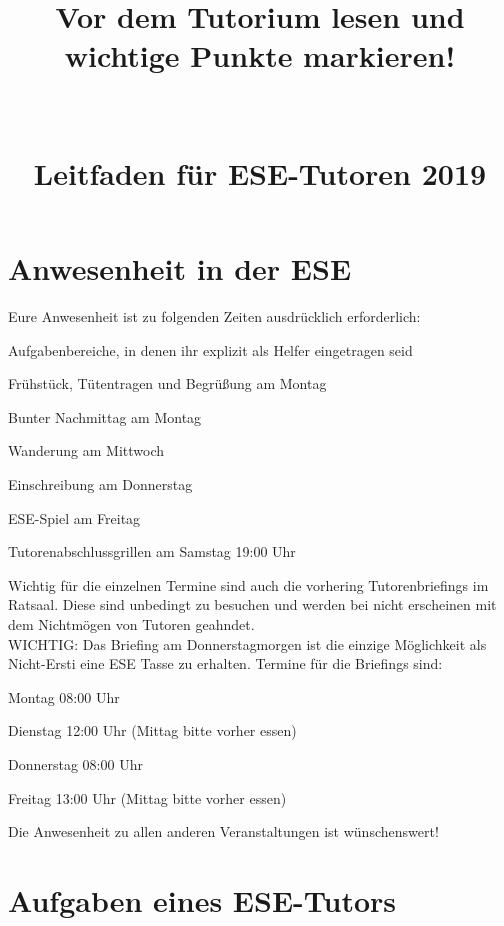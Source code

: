 \documentclass[a4paper,12pt]{report}
\begin{document}
\title{\huge{\textbf{Vor dem Tutorium lesen und wichtige Punkte markieren!}}\\\ \\\ \\{Leitfaden für ESE-Tutoren 2019}}
\date{}
\author{}
\maketitle

\section*{Anwesenheit in der ESE}
Eure Anwesenheit ist zu folgenden Zeiten ausdrücklich erforderlich:
\begin{itemize*}
	\item Aufgabenbereiche, in denen ihr explizit als Helfer eingetragen seid
	\item Frühstück, Tütentragen und Begrüßung am Montag
	\item Bunter Nachmittag am Montag
	\item Wanderung am Mittwoch
	\item Einschreibung am Donnerstag
	\item ESE-Spiel am Freitag
	\item Tutorenabschlussgrillen am Samstag 19:00 Uhr %
\end{itemize*}
Wichtig für die einzelnen Termine sind auch die vorhering Tutorenbriefings im Ratsaal. Diese sind unbedingt zu besuchen und werden bei nicht erscheinen mit dem Nichtmögen von Tutoren geahndet.\\
WICHTIG: Das Briefing am Donnerstagmorgen ist die einzige Möglichkeit als Nicht-Ersti eine ESE Tasse zu erhalten.
Termine für die Briefings sind:
\begin{itemize*}
	\item Montag   		08:00 Uhr
	\item Dienstag 		12:00 Uhr (Mittag bitte vorher essen)
	\item Donnerstag	08:00 Uhr
	\item Freitag		13:00 Uhr (Mittag bitte vorher essen)
\end{itemize*}

Die Anwesenheit zu allen anderen Veranstaltungen ist wünschenswert!

\section*{Aufgaben eines ESE-Tutors}
\end{document}
